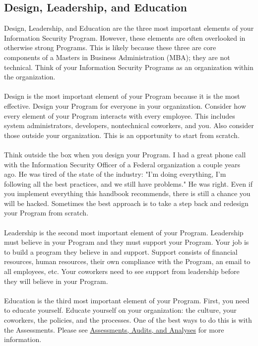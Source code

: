 \subsection{Design, Leadership, and Education}
Design, Leadership, and Education are the three most important elements of your Information Security Program. However, these elements are often overlooked in otherwise strong Programs. This is likely because these three are core components of a Masters in Business Administration (MBA); they are not technical. Think of your Information Security Programs as an organization within the organization.\\\\
Design is the most important element of your Program because it is the most effective. Design your Program for everyone in your organization. Consider how every element of your Program interacts with every employee. This includes system administrators, developers, nontechnical coworkers, and you. Also consider those outside your organization. This is an opportunity to start from scratch.\\\\
Think outside the box when you design your Program. I had a great phone call with the Information Security Officer of a Federal organization a couple years ago. He was tired of the state of the industry: "I'm doing everything, I'm following all the best practices, and we still have problems." He was right. Even if you implement everything this handbook recommends, there is still a chance you will be hacked. Sometimes the best approach is to take a step back and redesign your Program from scratch.\\\\
Leadership is the second most important element of your Program. Leadership must believe in your Program and they must support your Program. Your job is to build a program they believe in and support. Support consists of financial resources, human resources, their own compliance with the Program, an email to all employees, etc. Your coworkers need to see support from leadership before they will believe in your Program.\\\\
Education is the third most important element of your Program. First, you need to educate yourself. Educate yourself on your organization: the culture, your coworkers, the policies, and the processes. One of the best ways to do this is with the Assessments. Please see \hyperref[sec:"Assessments, Audits, and Analyses"]{Assessments, Audits, and Analyses} for more information.\\\\
